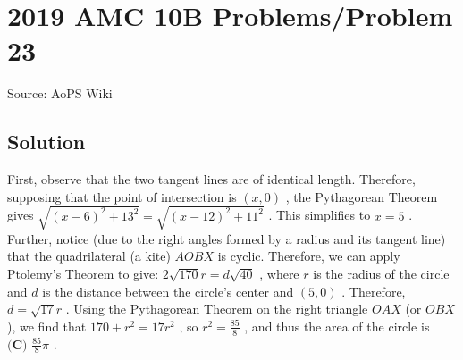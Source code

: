\documentclass[12pt]{article}
\begin{document}
\section*{{2019 AMC 10B Problems/Problem 23}}
Source: AoPS Wiki

\subsection*{Solution}
First, observe that the two tangent lines are of identical length. Therefore, supposing that the point of intersection is $(x, 0)$ , the Pythagorean Theorem gives $\sqrt{(x-6)^2 + 13^2} = \sqrt{(x-12)^2 + 11^2}$ . This simplifies to $x = 5$ . Further, notice (due to the right angles formed by a radius and its tangent line) that the quadrilateral (a kite) $AOBX$ is cyclic. Therefore, we can apply Ptolemy's Theorem to give: $2\sqrt{170}r = d \sqrt{40}$ , where $r$ is the radius of the circle and $d$ is the distance between the circle's center and $(5, 0)$ . Therefore, $d = \sqrt{17}r$ . Using the Pythagorean Theorem on the right triangle $OAX$ (or $OBX$ ), we find that $170 + r^2 = 17r^2$ , so $r^2 = \frac{85}{8}$ , and thus the area of the circle is $\boxed{\textbf{(C) }\frac{85}{8}\pi}$ .
\end{document}
